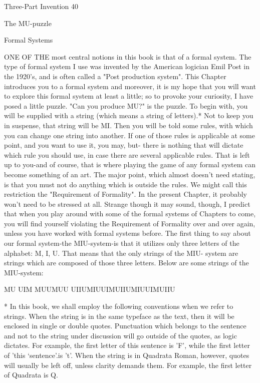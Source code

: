 Three-Part Invention                                                                           40



                                The MU-puzzle

                                         Formal Systems

ONE OF THE most central notions in this book is that of a formal system. The type of
formal system I use was invented by the American logician Emil Post in the 1920's, and
is often called a "Post production system". This Chapter introduces you to a formal
system and moreover, it is my hope that you will want to explore this formal system at
least a little; so to provoke your curiosity, I have posed a little puzzle.
         "Can you produce MU?" is the puzzle. To begin with, you will be supplied with a
string (which means a string of letters).* Not to keep you in suspense, that string will be
MI. Then you will be told some rules, with which you can change one string into another.
If one of those rules is applicable at some point, and you want to use it, you may, but-
there is nothing that will dictate which rule you should use, in case there are several
applicable rules. That is left up to you-and of course, that is where playing the game of
any formal system can become something of an art. The major point, which almost
doesn't need stating, is that you must not do anything which is outside the rules. We
might call this restriction the "Requirement of Formality". In the present Chapter, it
probably won't need to be stressed at all. Strange though it may sound, though, I predict
that when you play around with some of the formal systems of Chapters to come, you
will find yourself violating the Requirement of Formality over and over again, unless you
have worked with formal systems before.
         The first thing to say about our formal system-the MIU-system-is that it utilizes
only three letters of the alphabet: M, I, U. That means that the only strings of the MIU-
system are strings which are composed of those three letters. Below are some strings of
the MIU-system:

                                  MU
                                  UIM
                                  MUUMUU
                                  UIIUMIUUIMUIIUMIUUIMUIIU

* In this book, we shall employ the following conventions when we refer to strings. When the
string is in the same typeface as the text, then it will be enclosed in single or double quotes.
Punctuation which belongs to the sentence and not to the string under discussion will go outside
of the quotes, as logic dictates. For example, the first letter of this sentence is 'F', while the first
letter of 'this ‘sentence’.is 't'. When the string is in Quadrata Roman, however, quotes will
usually be left off, unless clarity demands them. For example, the first letter of Quadrata is Q.




